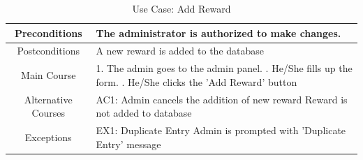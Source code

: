 \documentclass[12pt, a4paper, oneside]{article}
\begin{document}
\begin{table}[H]
\begin{tabularx}{\linewidth}{|c|X|}
Preconditions       & The administrator is authorized to make changes.                                                                                                                                                                                                                           \\ \hline
Postconditions      & A new reward is added to the database                                                                                                                                        \\ \hline
Main Course         & 1. The admin goes to the admin panel. \newline 2. He/She fills up the form.  \newline 3. He/She clicks the 'Add Reward' button \\ \hline
Alternative Courses & AC1: Admin cancels the addition of new reward \newline Reward is not added to database                                                                                             \\ \hline
Exceptions          & EX1: Duplicate Entry \newline Admin is prompted with 'Duplicate Entry' message \\ \hline
\end{tabularx}
\caption{Use Case: Add Reward}
\label{uc-add-reward}
\end{table}
\end{document}
